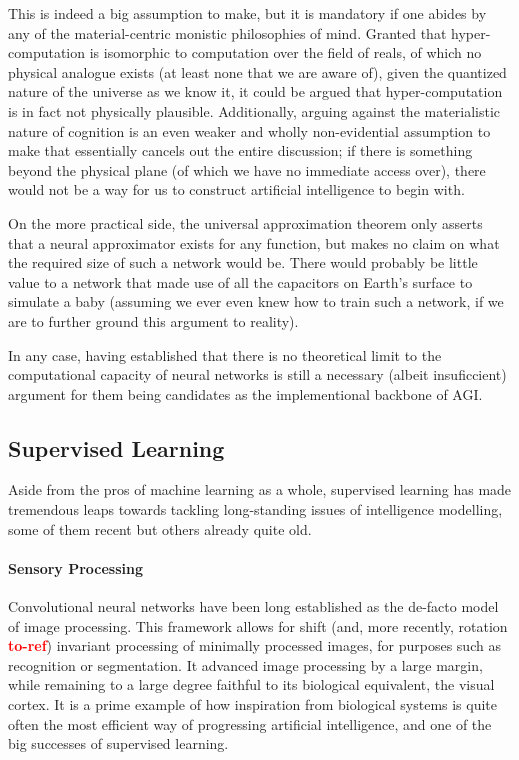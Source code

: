 \documentclass[]{article}
\newcommand\toref{\textcolor{red}{\bf{to-ref}}}
\begin{document}
This is indeed a big assumption to make, but it is mandatory if one abides by any of the material-centric monistic philosophies of mind. Granted that hyper-computation is isomorphic to computation over the field of reals, of which no physical analogue exists (at least none that we are aware of), given the quantized nature of the universe as we know it, it could be argued that hyper-computation is in fact not physically plausible. Additionally, arguing against the materialistic nature of cognition is an even weaker and wholly non-evidential assumption to make that essentially cancels out the entire discussion; if there is something beyond the physical plane (of which we have no immediate access over), there would not be a way for us to construct artificial intelligence to begin with.

On the more practical side, the universal approximation theorem only asserts that a neural approximator exists for any function, but makes no claim on what the required size of such a network would be. There would probably be little value to a network that made use of all the capacitors on Earth's surface to simulate a baby (assuming we ever even knew how to train such a network, if we are to further ground this argument to reality). 

In any case, having established that there is no theoretical limit to the computational capacity of neural networks is still a necessary (albeit insuficcient) argument for them being candidates as the implementional backbone of AGI.

\subsection{Supervised Learning}
Aside from the pros of machine learning as a whole, supervised learning has made tremendous leaps towards tackling long-standing issues of intelligence modelling, some of them recent but others already quite old.

\paragraph{Sensory Processing} Convolutional neural networks have been long established as the de-facto model of image processing. This framework allows for shift (and, more recently, rotation \toref ) invariant processing of minimally processed images, for purposes such as recognition or segmentation. It advanced image processing by a large margin, while remaining to a large degree faithful to its biological equivalent, the visual cortex. It is a prime example of how inspiration from biological systems is quite often the most efficient way of progressing artificial intelligence, and one of the big successes of supervised learning.
\end{document}
